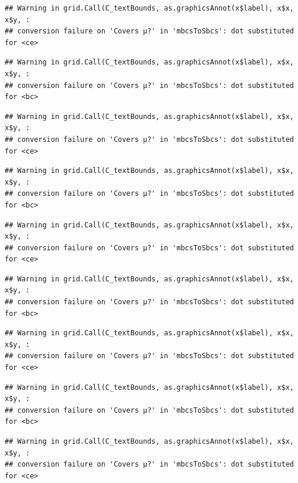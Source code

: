 \documentclass[
]{book}
\begin{document}
\begin{verbatim}
## Warning in grid.Call(C_textBounds, as.graphicsAnnot(x$label), x$x, x$y, :
## conversion failure on 'Covers μ?' in 'mbcsToSbcs': dot substituted for <ce>
\end{verbatim}

\begin{verbatim}
## Warning in grid.Call(C_textBounds, as.graphicsAnnot(x$label), x$x, x$y, :
## conversion failure on 'Covers μ?' in 'mbcsToSbcs': dot substituted for <bc>
\end{verbatim}

\begin{verbatim}
## Warning in grid.Call(C_textBounds, as.graphicsAnnot(x$label), x$x, x$y, :
## conversion failure on 'Covers μ?' in 'mbcsToSbcs': dot substituted for <ce>
\end{verbatim}

\begin{verbatim}
## Warning in grid.Call(C_textBounds, as.graphicsAnnot(x$label), x$x, x$y, :
## conversion failure on 'Covers μ?' in 'mbcsToSbcs': dot substituted for <bc>
\end{verbatim}

\begin{verbatim}
## Warning in grid.Call(C_textBounds, as.graphicsAnnot(x$label), x$x, x$y, :
## conversion failure on 'Covers μ?' in 'mbcsToSbcs': dot substituted for <ce>
\end{verbatim}

\begin{verbatim}
## Warning in grid.Call(C_textBounds, as.graphicsAnnot(x$label), x$x, x$y, :
## conversion failure on 'Covers μ?' in 'mbcsToSbcs': dot substituted for <bc>
\end{verbatim}

\begin{verbatim}
## Warning in grid.Call(C_textBounds, as.graphicsAnnot(x$label), x$x, x$y, :
## conversion failure on 'Covers μ?' in 'mbcsToSbcs': dot substituted for <ce>
\end{verbatim}

\begin{verbatim}
## Warning in grid.Call(C_textBounds, as.graphicsAnnot(x$label), x$x, x$y, :
## conversion failure on 'Covers μ?' in 'mbcsToSbcs': dot substituted for <bc>
\end{verbatim}

\begin{verbatim}
## Warning in grid.Call(C_textBounds, as.graphicsAnnot(x$label), x$x, x$y, :
## conversion failure on 'Covers μ?' in 'mbcsToSbcs': dot substituted for <ce>
\end{verbatim}
\end{document}
